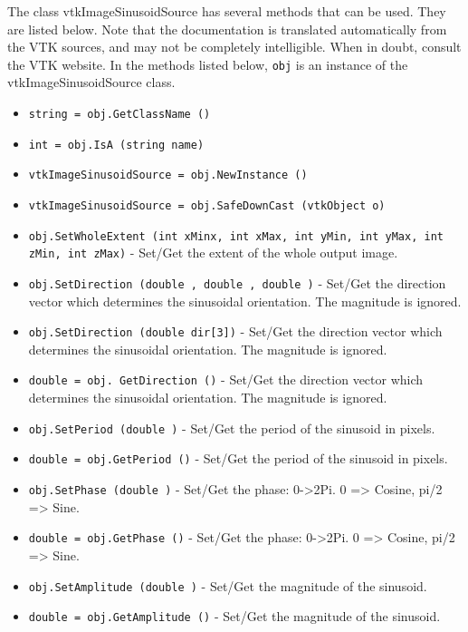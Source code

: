 The class vtkImageSinusoidSource has several methods that can be used.
  They are listed below.
Note that the documentation is translated automatically from the VTK sources,
and may not be completely intelligible.  When in doubt, consult the VTK website.
In the methods listed below, \verb|obj| is an instance of the vtkImageSinusoidSource class.
\begin{itemize}
\item  \verb|string = obj.GetClassName ()|

\item  \verb|int = obj.IsA (string name)|

\item  \verb|vtkImageSinusoidSource = obj.NewInstance ()|

\item  \verb|vtkImageSinusoidSource = obj.SafeDownCast (vtkObject o)|

\item  \verb|obj.SetWholeExtent (int xMinx, int xMax, int yMin, int yMax, int zMin, int zMax)| -  Set/Get the extent of the whole output image.

\item  \verb|obj.SetDirection (double , double , double )| -  Set/Get the direction vector which determines the sinusoidal
 orientation. The magnitude is ignored.

\item  \verb|obj.SetDirection (double dir[3])| -  Set/Get the direction vector which determines the sinusoidal
 orientation. The magnitude is ignored.

\item  \verb|double = obj. GetDirection ()| -  Set/Get the direction vector which determines the sinusoidal
 orientation. The magnitude is ignored.

\item  \verb|obj.SetPeriod (double )| -  Set/Get the period of the sinusoid in pixels.

\item  \verb|double = obj.GetPeriod ()| -  Set/Get the period of the sinusoid in pixels.

\item  \verb|obj.SetPhase (double )| -  Set/Get the phase: 0->2Pi.  0 => Cosine, pi/2 => Sine.

\item  \verb|double = obj.GetPhase ()| -  Set/Get the phase: 0->2Pi.  0 => Cosine, pi/2 => Sine.

\item  \verb|obj.SetAmplitude (double )| -  Set/Get the magnitude of the sinusoid.

\item  \verb|double = obj.GetAmplitude ()| -  Set/Get the magnitude of the sinusoid.

\end{itemize}
